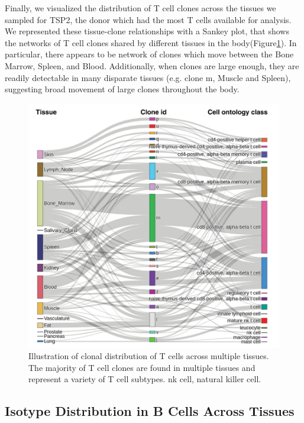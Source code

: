 Finally, we visualized the distribution of T cell clones across the tissues we sampled for TSP2, the donor which had the most T cells available for analysis. We represented these tissue-clone relationships with a Sankey plot, that shows the networks of T cell clones shared by different tissues in the body(Figure\ref{fig:TabulaSapiens_sankey}). In particular, there appears to be network of clones which move between the Bone Marrow, Spleen, and Blood. Additionally, when clones are large enough, they are readily detectable in many disparate tissues (e.g. clone m, Muscle and Spleen), suggesting broad movement of large clones throughout the body.    
\begin{figure}[hbt!]
\centering
\includegraphics[width=14cm, keepaspectratio]{figs/TabulaSapiens/fig4_sankey.png}
\caption[Sankey Plot of T cell clones in Tabula Sapiens]{Illustration of clonal distribution of T cells across multiple tissues. The majority of T cell clones are found in multiple tissues and represent a variety of T cell subtypes. nk cell, natural killer cell.}
\label{fig:TabulaSapiens_sankey}
\end{figure}



\subsection{Isotype Distribution in B Cells Across Tissues}

